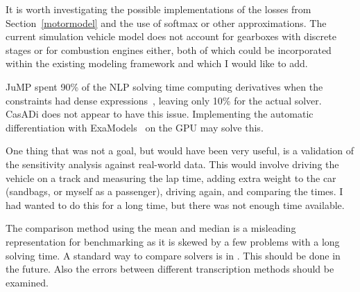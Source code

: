 It is worth investigating the possible implementations of the losses from Section~\ref{motormodel} and the use of softmax or other approximations. The current simulation vehicle model does not account for gearboxes with discrete stages or for combustion engines either, both of which could be incorporated within the existing modeling framework and which I would like to add.

JuMP spent 90\% of the NLP solving time computing derivatives when the constraints had dense expressions~\cite{julia_discourse_ipopt_hessian}, leaving only 10\% for the actual solver. CasADi does not appear to have this issue. Implementing the automatic differentiation with ExaModels~\cite{shin2024accelerating} on the GPU may solve this.

One thing that was not a goal, but would have been very useful, is a validation of the sensitivity analysis against real-world data. This would involve driving the vehicle on a track and measuring the lap time, adding extra weight to the car (sandbags, or myself as a passenger), driving again, and comparing the times. I had wanted to do this for a long time, but there was not enough time available.

The comparison method using the mean and median is a misleading representation for benchmarking as it is skewed by a few problems with a long solving time. A standard way to compare solvers is in \cite{dolanBenchmarkingOptimizationSoftware2004}. This should be done in the future. Also the errors between different transcription methods should be examined.






